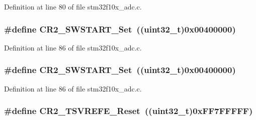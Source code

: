 Definition at line 80 of file stm32f10x\+\_\+adc.\+c.

\subsubsection[{\texorpdfstring{C\+R2\+\_\+\+S\+W\+S\+T\+A\+R\+T\+\_\+\+Set}{CR2_SWSTART_Set}}]{\setlength{\rightskip}{0pt plus 5cm}\#define C\+R2\+\_\+\+S\+W\+S\+T\+A\+R\+T\+\_\+\+Set~(({\bf uint32\+\_\+t})0x00400000)}\hypertarget{group___a_d_c___private___defines_gac40733c6a8918c16cd52fcade75a6de6}{}\label{group___a_d_c___private___defines_gac40733c6a8918c16cd52fcade75a6de6}


Definition at line 86 of file stm32f10x\+\_\+adc.\+c.

\subsubsection[{\texorpdfstring{C\+R2\+\_\+\+S\+W\+S\+T\+A\+R\+T\+\_\+\+Set}{CR2_SWSTART_Set}}]{\setlength{\rightskip}{0pt plus 5cm}\#define C\+R2\+\_\+\+S\+W\+S\+T\+A\+R\+T\+\_\+\+Set~(({\bf uint32\+\_\+t})0x00400000)}\hypertarget{group___a_d_c___private___defines_gac40733c6a8918c16cd52fcade75a6de6}{}\label{group___a_d_c___private___defines_gac40733c6a8918c16cd52fcade75a6de6}


Definition at line 86 of file stm32f10x\+\_\+adc.\+c.

\subsubsection[{\texorpdfstring{C\+R2\+\_\+\+T\+S\+V\+R\+E\+F\+E\+\_\+\+Reset}{CR2_TSVREFE_Reset}}]{\setlength{\rightskip}{0pt plus 5cm}\#define C\+R2\+\_\+\+T\+S\+V\+R\+E\+F\+E\+\_\+\+Reset~(({\bf uint32\+\_\+t})0x\+F\+F7\+F\+F\+F\+F\+F)}\hypertarget{group___a_d_c___private___defines_gaa207bc0eeed8b546dc9536b02df633b5}{}\label{group___a_d_c___private___defines_gaa207bc0eeed8b546dc9536b02df633b5}


